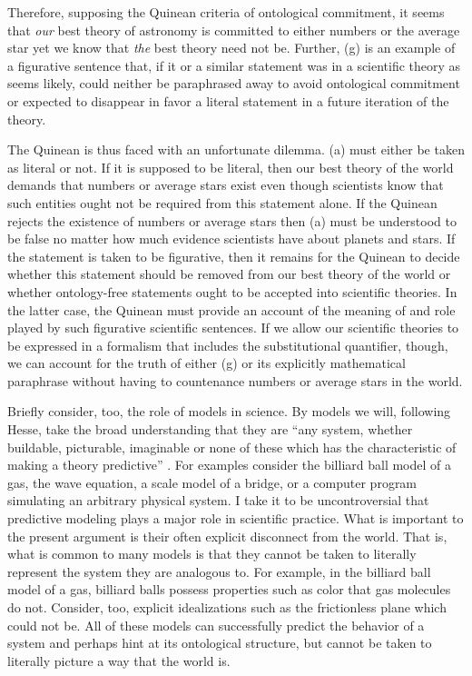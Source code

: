 Therefore, supposing the Quinean criteria of ontological commitment,
it seems that \emph{our} best theory of astronomy is committed to
either numbers or the average star yet we know that \emph{the} best
theory need not be. Further, (g) is an example of a figurative
sentence that, if it or a similar statement was in a scientific theory
as seems likely, could neither be paraphrased away to avoid
ontological commitment or expected to disappear in favor a literal
statement in a future iteration of the theory.

The Quinean is thus faced with an unfortunate dilemma. (a) must either
be taken as literal or not.  If it is supposed to be literal, then our
best theory of the world demands that numbers or average stars exist
even though scientists know that such entities ought not be required
from this statement alone. If the Quinean rejects the existence of
numbers or average stars then (a) must be understood to be false no
matter how much evidence scientists have about planets and stars.  If
the statement is taken to be figurative, then it remains for the
Quinean to decide whether this statement should be removed from our
best theory of the world or whether ontology-free statements ought to
be accepted into scientific theories.  In the latter case, the Quinean
must provide an account of the meaning of and role played by such
figurative scientific sentences. If we allow our scientific theories
to be expressed in a formalism that includes the substitutional
quantifier, though, we can account for the truth of either (g) or its
explicitly mathematical paraphrase without having to countenance
numbers or average stars in the world.  

Briefly consider, too, the role of models in science.  By models we
will, following Hesse, take the broad understanding that they are
``any system, whether buildable, picturable, imaginable or none of
these which has the characteristic of making a theory predictive''
\cite[p.21]{hesse}.  For examples consider the billiard ball model of
a gas, the wave equation, a scale model of a bridge, or a computer
program simulating an arbitrary physical system.  I take it to be
uncontroversial that predictive modeling plays a major role in
scientific practice.  What is important to the present argument is
their often explicit disconnect from the world.  That is, what is
common to many models is that they cannot be taken to literally
represent the system they are analogous to.  For example, in the
billiard ball model of a gas, billiard balls possess properties such
as color that gas molecules do not. Consider, too, explicit
idealizations such as the frictionless plane which could not be.  All
of these models can successfully predict the behavior of a system and
perhaps hint at its ontological structure, but cannot be taken to
literally picture a way that the world is.

